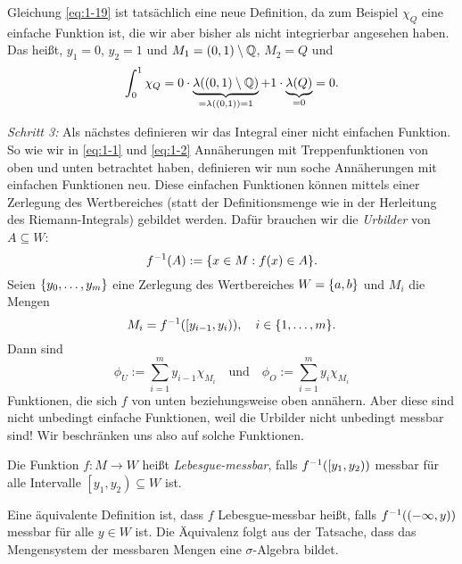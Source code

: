 \begin{remark}
	Gleichung \eqref{eq:1-19} ist tatsächlich eine neue Definition, da zum Beispiel \(\chi_Q\) eine einfache Funktion ist, die wir aber bisher als nicht integrierbar angesehen haben.
	Das heißt, \(y_1 = 0\), \(y_2 = 1\) und \(M_1 = \parentheses*{0, 1} \setminus \Q\), \(M_2 = Q\) und
	\[
		\int_0^1 \chi_Q = 0 \cdot \underbrace{\lambda\parentheses*{\parentheses*{0, 1} \setminus \Q}}_{= \lambda\parentheses*{\parentheses*{0, 1}} = 1} + 1 \cdot \underbrace{\lambda\parentheses*{Q}}_{= 0} = 0.
	\]
\end{remark}

\emph{Schritt 3:} Als nächstes definieren wir das Integral einer nicht einfachen Funktion.
So wie wir in \eqref{eq:1-1} und \eqref{eq:1-2} Annäherungen mit Treppenfunktionen von oben und unten betrachtet haben, definieren wir nun soche Annäherungen mit einfachen Funktionen neu.
Diese einfachen Funktionen können mittels einer Zerlegung des Wertbereiches (statt der Definitionsmenge wie in der Herleitung des Riemann-Integrals) gebildet werden.
Dafür brauchen wir die \emph{Urbilder} von \(A \subseteq W\):
\[
	f^{-1}\parentheses*{A} := \braces*{x \in M : f\parentheses*{x} \in A}.
\]
Seien \(\braces*{y_0, \ldots, y_m}\) eine Zerlegung des Wertbereiches \(W = \braces*{a, b}\) und \(M_i\) die Mengen
\[
	M_i = f^{-1}\parentheses*{\left[y_{i - 1}, y_i\right)}, \quad i \in \braces*{1, \ldots, m}.
\]
Dann sind
\[
	\phi_U := \sum_{i = 1}^m y_{i - 1}\chi_{M_i} \quad \text{und} \quad \phi_O := \sum_{i = 1}^m y_i \chi_{M_i}
\]
Funktionen, die sich \(f\) von unten beziehungsweise oben annähern.
Aber diese sind nicht unbedingt einfache Funktionen, weil die Urbilder nicht unbedingt messbar sind!
Wir beschränken uns also auf solche Funktionen.

\begin{definition}
	Die Funktion \(f: M \to W\) heißt \emph{Lebesgue-messbar}, falls \(f^{-1}\parentheses*{\left[y_1, y_2\right)}\) messbar für alle Intervalle \(\left[y_1, y_2\right) \subseteq W\) ist.
\end{definition}

\begin{remark}
	Eine äquivalente Definition ist, dass \(f\) Lebesgue-messbar heißt, falls \(f^{-1}\parentheses*{\parentheses*{-\infty, y}}\) messbar für alle \(y \in W\) ist.
	Die Äquivalenz folgt aus der Tatsache, dass das Mengensystem der messbaren Mengen eine \(\sigma\)-Algebra bildet.
\end{remark}

